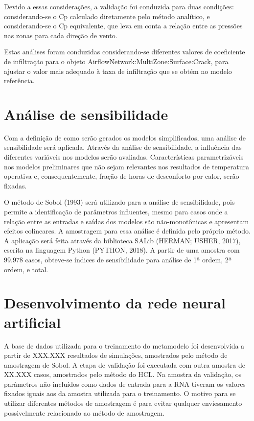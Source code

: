 \documentclass[brazil,hardcopy,openany,a5paper]{ufscthesis}
\begin{document}
		Devido a essas considerações, a validação foi conduzida para duas condições: considerando-se o Cp calculado diretamente pelo método analítico, e considerando-se o Cp equivalente, que leva em conta a relação entre as pressões nas zonas para cada direção de vento.
		
		Estas análises foram conduzidas considerando-se diferentes valores de coeficiente de infiltração para o objeto AirflowNetwork:MultiZone:Surface:Crack, para ajustar o valor mais adequado à taxa de infiltração que se obtém no modelo referência.
		
		
		\section{Análise de sensibilidade}
		
		Com a definição de como serão gerados os modelos simplificados, uma análise de sensibilidade será aplicada. Através da análise de sensibilidade, a influência das diferentes variáveis nos modelos serão avaliadas. Características parametrizáveis nos modelos preliminares que não sejam relevantes nos resultados de temperatura operativa e, consequentemente, fração de horas de desconforto por calor, serão fixadas.
		
		O método de Sobol (1993) será utilizado para a análise de sensibilidade, pois permite a identificação de parâmetros influentes, mesmo para casos onde a relação entre as entradas e saídas dos modelos são não-monotônicas  e apresentam efeitos colineares. A amostragem para essa análise é definida pelo próprio método. A aplicação será feita através da biblioteca SALib (HERMAN; USHER, 2017), escrita na linguagem Python (PYTHON, 2018). A partir de uma amostra com 99.978 casos, obteve-se índices de sensibilidade para análise de 1ª ordem, 2ª ordem, e total.
		
		\section{Desenvolvimento da rede neural artificial}
		
		A base de dados utilizada para o treinamento do metamodelo foi desenvolvida a partir de XXX.XXX resultados de simulações, amostrados pelo método de amostragem de Sobol. A etapa de validação foi executada com outra amostra de XX.XXX casos, amostrados pelo método do HCL. Na amostra da validação, os parâmetros não incluídos como dados de entrada para a RNA tiveram os valores fixados iguais aos da amostra utilizada para o treinamento. O motivo para se utilizar diferentes métodos de amostragem é para evitar qualquer enviesamento possivelmente relacionado ao método de amostragem.
		
\end{document}

